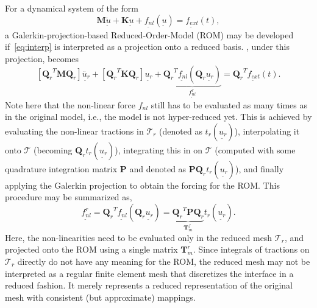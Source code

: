 \documentclass[10pt,print]{article}
\newcommand{\utilde}[1]{\underset{\widetilde{}}{#1}}
\begin{document}
For a dynamical system of the form
  \begin{equation}
    \label{eq:dynsys}
    \mathbf{M} \ddot{\utilde{u}} + \mathbf{K} \utilde{u} +
    \utilde{f_{nl}}(\utilde{u}) = \utilde{f_{ext}}(t),
  \end{equation}
  a Galerkin-projection-based Reduced-Order-Model (ROM) may be
  developed if~\cref{eq:interp} is interpreted as a projection onto a
  reduced basis. , under this projection, becomes
  \begin{equation}
    \label{eq:ROMsys}
    \left[{\mathbf{Q}_r}^T \mathbf{M} \mathbf{Q}_r\right]
    \ddot{\utilde{u_r}} + \left[{\mathbf{Q}_r}^T \mathbf{K}
      \mathbf{Q}_r\right] \utilde{u_r} + \underbrace{{\mathbf{Q}_r}^T 
    \utilde{f_{nl}}(\mathbf{Q}_r\utilde{u_r})}_{\utilde{f_{nl}^{r}}} =
  {\mathbf{Q}_r}^T \utilde{f_{ext}}(t).
  \end{equation}
  Note here that the non-linear force $f_{nl}$ still has to be
  evaluated as many times as in the original model, i.e., the model is
  not hyper-reduced yet. This is achieved by evaluating the non-linear
  tractions in $\mathcal{T}_r$ (denoted as $t_r(\utilde{u_r})$),
  interpolating it onto $\mathcal{T}$ (becoming
  $\mathbf{Q}_rt_r(\utilde{u_r})$), integrating this in on
  $\mathcal{T}$ (computed with some quadrature integration matrix
  $\mathbf{P}$ and denoted as
  $\mathbf{P}\mathbf{Q}_rt_r(\utilde{u_r})$), and finally applying the
  Galerkin projection to obtain the forcing for the ROM. This
  procedure may be summarized as,
  \begin{equation}
    \label{eq:hyperred}
    \utilde{f_{nl}^r} = {\mathbf{Q}_r}^T
    \utilde{f_{nl}}(\mathbf{Q}_r\utilde{u_r}) =
    \underbrace{{\mathbf{Q}_r}^T\mathbf{P}\mathbf{Q}_r}_{\mathbf{T}_m^f}t_r(\utilde{u_r}).
  \end{equation}
  Here, the non-linearities need to be evaluated only in the reduced
  mesh $\mathcal{T}_r$, and projected onto the ROM using a single
  matrix $\mathbf{T}_m^r$. Since integrals of tractions on
  $\mathcal{T}_r$ directly do not have any meaning for the ROM, the
  reduced mesh may not be interpreted as a regular finite element mesh
  that discretizes the interface in a reduced fashion. It merely
  represents a reduced representation of the original mesh with
  consistent (but approximate) mappings.
\end{document}
